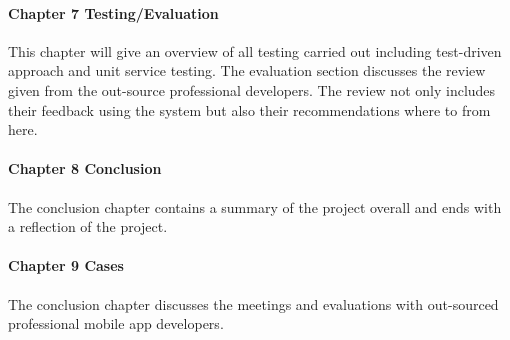 \paragraph{Chapter 7 Testing/Evaluation}

This chapter will give an overview of all testing carried out including test-driven approach and unit service testing. The evaluation section discusses the review given from the out-source professional developers. The review not only includes their feedback using the system but also their recommendations where to from here. 

\paragraph{Chapter 8 Conclusion}
The conclusion chapter contains a summary of the project overall and ends with a reflection of the project.

\paragraph{Chapter 9 Cases}
The conclusion chapter discusses the meetings and evaluations with out-sourced professional mobile app developers.